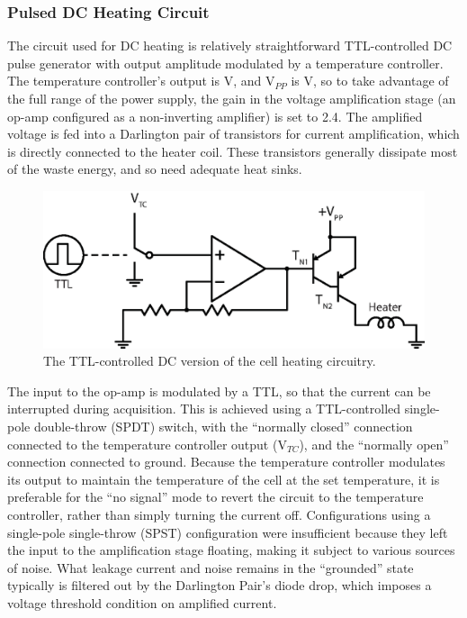 \documentclass[PaulGanssle-Thesis.tex]{subfiles}
\begin{document}
\subsubsection{Pulsed DC Heating Circuit}
\label{mag.design.pulsed.DC.circuit}
The circuit used for DC heating is relatively straightforward TTL-controlled DC pulse generator with output amplitude modulated by a temperature controller. The temperature controller's output is \unit[1-10]{V}, and V$_{PP}$ is \unit[24]{V}, so to take advantage of the full range of the power supply, the gain in the voltage amplification stage (an op-amp configured as a non-inverting amplifier) is set to 2.4. The amplified voltage is fed into a Darlington pair of transistors for current amplification, which is directly connected to the heater coil. These transistors generally dissipate most of the waste energy, and so need adequate heat sinks.

\begin{figure}[h!]
\includegraphics[width=0.8\tw]{figures/magnetometer/HeaterCircuitDC.eps}
\caption{The TTL-controlled DC version of the cell heating circuitry.}
\label{fig:DCHeaterCircuit}
\end{figure}

The input to the op-amp is modulated by a TTL, so that the current can be interrupted during acquisition. This is achieved using a TTL-controlled single-pole double-throw (SPDT) switch, with the ``normally closed'' connection connected to the temperature controller output (V$_{TC}$), and the ``normally open'' connection connected to ground. Because the temperature controller modulates its output to maintain the temperature of the cell at the set temperature, it is preferable for the ``no signal'' mode to revert the circuit to the temperature controller, rather than simply turning the current off. Configurations using a single-pole single-throw (SPST) configuration were insufficient because they left the input to the amplification stage floating, making it subject to various sources of noise. What leakage current and noise remains in the ``grounded'' state typically is filtered out by the Darlington Pair's diode drop, which imposes a voltage threshold condition on amplified current.
\end{document}
